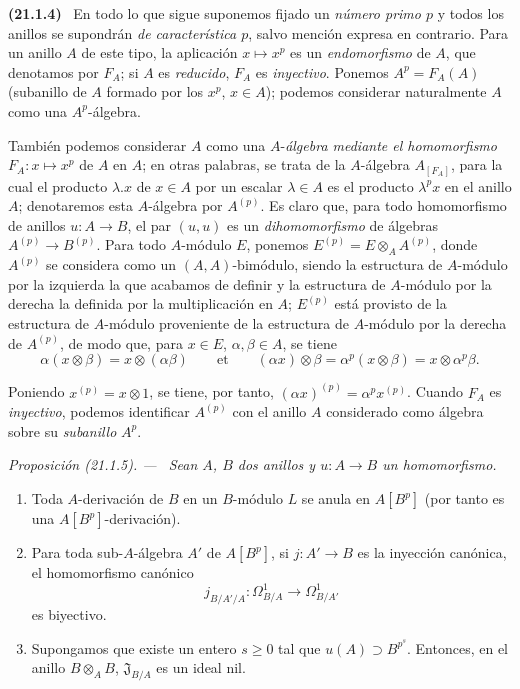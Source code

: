 \documentclass[10pt,oneside]{book}
\makeatletter
\newcommand{\setmanualcurrentlabel}[1]{\def\@currentlabel{#1}}
\newcommand{\oldpage}[2][]{%
  \setcounter{footnote}{0}%
  \marginpar{\scriptsize\textbf{#1}~|~#2}\ignorespaces}
\newenvironment{env}[1][]{\setmanualcurrentlabel{#1}\par\medskip\noindent\textbf{(#1)}\ }{\par}
\newenvironment{proposition}[1][]{%
  \setmanualcurrentlabel{#1}\par\medskip\noindent\itshape Proposición (#1). ---\ }{\par}
\makeatother
\begin{document}
\begin{env}[21.1.4]
\label{0.21.1.4-es}
En todo lo que sigue suponemos fijado un \emph{número primo $p$} y todos los anillos
se supondrán \emph{de característica $p$}, salvo mención expresa en contrario. Para
un anillo $A$ de este tipo, la aplicación $x\mapsto x^p$ es un \emph{endomorfismo} de
$A$, que denotamos por $F_A$; si $A$ es \emph{reducido}, $F_A$ es \emph{inyectivo}. Ponemos
$A^p=F_A(A)$ (subanillo de $A$ formado por los $x^p$, $x\in A$); podemos
considerar naturalmente $A$ como una $A^p$-álgebra.

También podemos considerar $A$ como una $A$-\emph{álgebra mediante el homomorfismo}
$F_A:x\mapsto x^p$ de $A$ en $A$; en otras palabras, se trata de la $A$-álgebra
$A_{[F_A]}$, para la cual el producto $\lambda.x$ de $x\in A$ por un
escalar $\lambda\in A$ es el producto $\lambda^p x$ en el anillo $A$; denotaremos esta $A$-álgebra por $A^{(p)}$. Es
claro que, para todo homomorfismo de anillos $u:A\to B$, el par $(u,u)$ es un
\emph{dihomomorfismo} de álgebras $A^{(p)}\to B^{(p)}$.
Para todo $A$-módulo $E$, ponemos $E^{(p)}=E\otimes_A A^{(p)}$, donde
$A^{(p)}$ se considera como un $(A,A)$-bimódulo, siendo la estructura de
$A$-módulo por la izquierda la que acabamos de definir y la estructura de
$A$-módulo por la derecha la definida por la multiplicación en $A$; $E^{(p)}$ está provisto de la estructura de $A$-módulo proveniente de la estructura de $A$-módulo por la derecha de $A^{(p)}$, de modo que,
para $x\in E$, $\alpha,\beta\in A$, se tiene
\[
  \alpha(x\otimes\beta)=x\otimes(\alpha\beta)\qquad\text{et}\qquad
  (\alpha x)\otimes\beta=\alpha^p(x\otimes\beta)=x\otimes\alpha^p\beta.
\]
\end{env}

\oldpage[0\textsubscript{IV-1}]{155}
Poniendo $x^{(p)}=x\otimes1$, se tiene, por tanto,
$(\alpha x)^{(p)}=\alpha^p x^{(p)}$. Cuando $F_A$ es \emph{inyectivo}, podemos
identificar $A^{(p)}$ con el anillo $A$ considerado como álgebra sobre su
\emph{subanillo} $A^p$.

\begin{proposition}[21.1.5]
\label{0.21.1.5-es}
Sean $A$, $B$ dos anillos y $u:A\to B$ un homomorfismo.
\begin{enumerate}
  \item[\textup{(i)}] Toda $A$-derivación de $B$ en un $B$-módulo $L$ se anula en
  $A[B^p]$ (por tanto es una $A[B^p]$-derivación).
  \item[\textup{(ii)}] Para toda sub-$A$-álgebra $A'$ de $A[B^p]$, si
  $j:A'\to B$ es la inyección canónica, el homomorfismo canónico
  \[
  j_{B/A'/A}:\Omega^1_{B/A}\longrightarrow\Omega^1_{B/A'}
  \]
  es biyectivo.
  \item[\textup{(iii)}] Supongamos que existe un entero $s\geq0$ tal que
  $u(A)\supset B^{p^s}$. Entonces, en el anillo $B\otimes_A B$,
  $\mathfrak J_{B/A}$ es un ideal nil.
\end{enumerate}
\end{proposition}
\end{document}
